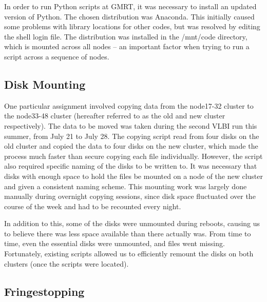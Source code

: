 \documentclass[a4paper,12pt]{article}
\begin{document}
In order to run Python scripts at GMRT, it was necessary to install an updated version of Python. The chosen distribution was Anaconda. This initially caused some problems with library locations for other codes, but was resolved by editing the shell login file. The distribution was installed in the /mnt/code directory, which is mounted across all nodes – an important factor when trying to run a script across a sequence of nodes.

\subsection{Disk Mounting}
\label{sec:diskmount}

One particular assignment involved copying data from the node17-32 cluster to the node33-48 cluster (hereafter referred to as the old and new cluster respectively). The data to be moved was taken during the second VLBI run this summer, from July 21 to July 28. The copying script read from four disks on the old cluster and copied the data to four disks on the new cluster, which made the process much faster than secure copying each file individually. However, the script also required specific naming of the disks to be written to. It was necessary that disks with enough space to hold the files be mounted on a node of the new cluster and given a consistent naming scheme. This mounting work was largely done manually during overnight copying sessions, since disk space fluctuated over the course of the week and had to be recounted every night.

In addition to this, some of the disks were unmounted during reboots, causing us to believe there was less space available than there actually was. From time to time, even the essential disks were unmounted, and files went missing. Fortunately, existing scripts allowed us to efficiently remount the disks on both clusters (once the scripts were located).

\subsection{Fringestopping}
\label{sec:fringestopping}
\end{document}
